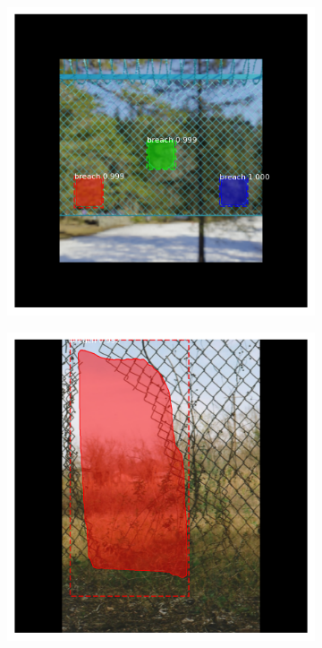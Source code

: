 \documentclass[../Head/Main.tex]{subfiles}
\begin{document}
\vspace{-10pt}
\begin{figure}[H]
    \centering
    \begin{subfigure}{.23\textwidth}
        \centering
        \includegraphics[width=\textwidth]{../Figures/rcnn_results/found_breaches/mask/0.png}
        \caption{}
    \end{subfigure}
    \hfill
    \begin{subfigure}{.23\textwidth}
        \centering
        \includegraphics[width=\textwidth]{../Figures/rcnn_results/found_breaches/mask/1.png}

\end{subfigure}
\end{figure}
\end{document}
